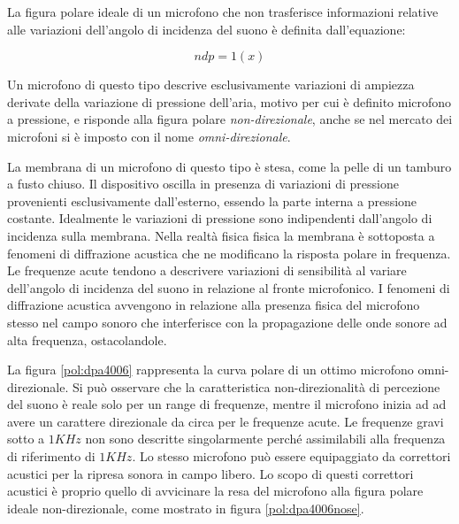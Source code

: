 \begin{refsection}
La figura polare ideale di un microfono che non trasferisce informazioni relative
alle variazioni dell'angolo di incidenza del suono è definita dall'equazione:

\begin{equation}
ndp = 1(x)
\label{eq:omni}
\end{equation}

Un microfono di questo tipo descrive esclusivamente variazioni di ampiezza
derivate della variazione di pressione dell'aria, motivo per cui è definito
microfono a pressione, e risponde alla figura polare \emph{non-direzionale}, anche se
nel mercato dei microfoni si è imposto con il nome \emph{omni-direzionale}.

La membrana di un microfono di questo tipo è stesa, come la pelle di un tamburo a fusto chiuso.
Il dispositivo oscilla in presenza di variazioni di pressione provenienti esclusivamente dall’esterno,
essendo la parte interna a pressione costante. Idealmente le variazioni di pressione sono indipendenti
dall’angolo di incidenza sulla membrana. Nella realtà fisica fisica la membrana
è sottoposta a fenomeni di diffrazione acustica che ne modificano la risposta polare in frequenza.
Le frequenze acute tendono a descrivere variazioni di sensibilità al variare
dell’angolo di incidenza del suono in relazione al fronte microfonico.
I fenomeni di diffrazione acustica avvengono in relazione alla presenza fisica
del microfono stesso nel campo sonoro che interferisce con la propagazione delle
onde sonore ad alta frequenza, ostacolandole.

La figura \ref{pol:dpa4006} rappresenta la curva polare di un ottimo microfono
omni-direzionale. Si può osservare che la caratteristica non-direzionalità di
percezione del suono è reale solo per un range di frequenze, mentre il microfono
inizia ad ad avere un carattere direzionale da circa per le frequenze acute.
Le frequenze gravi sotto a $1KHz$ non sono descritte singolarmente perché
assimilabili alla frequenza di riferimento di $1KHz$. Lo stesso microfono può essere
equipaggiato da correttori acustici per la ripresa sonora in campo libero. Lo
scopo di questi correttori acustici è proprio quello di avvicinare la resa del
microfono alla figura polare ideale non-direzionale, come mostrato in figura \ref{pol:dpa4006nose}.


\end{refsection}

